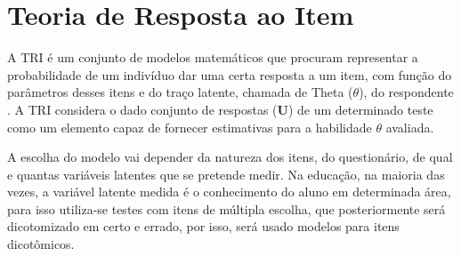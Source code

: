 \begin{comment}
\citeonline{freitas2005} sugeriram uma classificação para a consistência com base no coeficiente \textit{alpha} de Cronbach, na qual o intervalo varia de 0 a 1. A tabela \ref{class-consistencia} apresenta as escalas sugeridas.


\begin{table}[!htb]
	\IBGEtab{%
		\caption{Escala de consistência interna.}
		\label{class-consistencia}
	}{%
		
		
		\begin{tabular*}{.4\textwidth}{@{\extracolsep{\fill}}cc@{}}
			
			
			\toprule
			Valor de $\alpha$ & Consistência \\
			\midrule \midrule
			{$\alpha \leq 0,3 $} &  Muito Baixa \\
			\midrule
			{$ 0,30 < \alpha \leq 0,60 $} & Baixa \\
			\midrule
			{$ 0,60 < \alpha \leq 0,75 $}  & Moderada \\
			\midrule
			{$ 0,75 < \alpha \leq 0,90 $}  & Alta \\
			\midrule
			{$  \alpha \geq 0,90 $}  & Muito Alta \\
			\bottomrule
			
		\end{tabular*}
	}{%
		\fonte{Adaptado de Freitas e Rodrigues (2005)}
	}
\end{table}
\end{comment}







\section{Teoria de Resposta ao Item}

A TRI é um conjunto de modelos matemáticos que procuram representar a probabilidade de um indivíduo dar uma certa resposta a um item, com função do parâmetros desses itens e do traço latente, chamada de Theta ($\theta$), do respondente \cite{de2000teoria}. A TRI considera o dado conjunto de respostas ($\textbf{U}$) de um determinado teste como um elemento capaz de fornecer estimativas para a habilidade $\theta$ avaliada. \cite{baker2001}

A escolha do modelo vai depender da natureza dos itens, do questionário, de qual e quantas variáveis latentes que se pretende medir. Na educação, na maioria das vezes, a variável latente medida é o conhecimento do aluno em determinada área, para isso utiliza-se testes com itens de múltipla escolha, que posteriormente será dicotomizado em certo e errado, por isso, será usado modelos para itens dicotômicos. 





